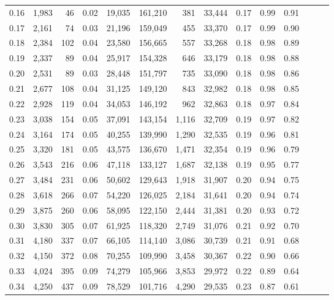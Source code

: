 \begin{tabular}{rrrrrrrrrrrrrr}
0.16 &  1,983 &   46 &  0.02 &   19,035 &  161,210 &     381 &  33,444 &  0.17 &  0.99 &      0.91 \\
0.17 &  2,161 &   74 &  0.03 &   21,196 &  159,049 &     455 &  33,370 &  0.17 &  0.99 &      0.90 \\
0.18 &  2,384 &  102 &  0.04 &   23,580 &  156,665 &     557 &  33,268 &  0.18 &  0.98 &      0.89 \\
0.19 &  2,337 &   89 &  0.04 &   25,917 &  154,328 &     646 &  33,179 &  0.18 &  0.98 &      0.88 \\
0.20 &  2,531 &   89 &  0.03 &   28,448 &  151,797 &     735 &  33,090 &  0.18 &  0.98 &      0.86 \\
0.21 &  2,677 &  108 &  0.04 &   31,125 &  149,120 &     843 &  32,982 &  0.18 &  0.98 &      0.85 \\
0.22 &  2,928 &  119 &  0.04 &   34,053 &  146,192 &     962 &  32,863 &  0.18 &  0.97 &      0.84 \\
0.23 &  3,038 &  154 &  0.05 &   37,091 &  143,154 &   1,116 &  32,709 &  0.19 &  0.97 &      0.82 \\
0.24 &  3,164 &  174 &  0.05 &   40,255 &  139,990 &   1,290 &  32,535 &  0.19 &  0.96 &      0.81 \\
0.25 &  3,320 &  181 &  0.05 &   43,575 &  136,670 &   1,471 &  32,354 &  0.19 &  0.96 &      0.79 \\
0.26 &  3,543 &  216 &  0.06 &   47,118 &  133,127 &   1,687 &  32,138 &  0.19 &  0.95 &      0.77 \\
0.27 &  3,484 &  231 &  0.06 &   50,602 &  129,643 &   1,918 &  31,907 &  0.20 &  0.94 &      0.75 \\
0.28 &  3,618 &  266 &  0.07 &   54,220 &  126,025 &   2,184 &  31,641 &  0.20 &  0.94 &      0.74 \\
0.29 &  3,875 &  260 &  0.06 &   58,095 &  122,150 &   2,444 &  31,381 &  0.20 &  0.93 &      0.72 \\
0.30 &  3,830 &  305 &  0.07 &   61,925 &  118,320 &   2,749 &  31,076 &  0.21 &  0.92 &      0.70 \\
0.31 &  4,180 &  337 &  0.07 &   66,105 &  114,140 &   3,086 &  30,739 &  0.21 &  0.91 &      0.68 \\
0.32 &  4,150 &  372 &  0.08 &   70,255 &  109,990 &   3,458 &  30,367 &  0.22 &  0.90 &      0.66 \\
0.33 &  4,024 &  395 &  0.09 &   74,279 &  105,966 &   3,853 &  29,972 &  0.22 &  0.89 &      0.64 \\
0.34 &  4,250 &  437 &  0.09 &   78,529 &  101,716 &   4,290 &  29,535 &  0.23 &  0.87 &      0.61 \\

\end{tabular}
